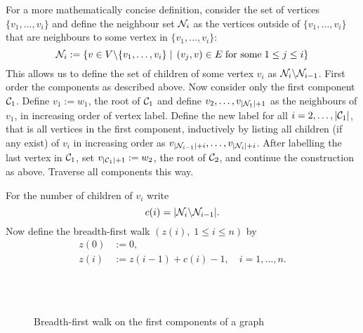 For a more mathematically concise definition,
consider the set of vertices $\{ v_1,\dots, v_i \}$
and define the neighbour set $\mathcal{N}_{i}$ as the vertices outside of
$\{ v_1,\dots, v_i \}$ 
that are neighbours to some vertex in 
$\{ v_1,\dots, v_i \}$:
\begin{equation} \label{D: Ni}
\mathcal{N}_{i} := 
\left\lbrace v \in V \backslash \{ v_1,\dots, v_i \} 
\; | \; 
\left(v_j, v\right) \in E \; \text{for some} \; 1 \leq j \leq i \right\rbrace
\end{equation}
This allows us to define the set of children of some vertex $v_i$ as
$\mathcal{N}_{i} \backslash \mathcal{N}_{i-1}$.
First order the components as described above. 
Now consider only the first component $\mathcal{C}_{1}$.
Define $v_1 := w_1$, the root of $\mathcal{C}_{1}$ and define
$v_2, \dots , v_{|\mathcal{N}_{1}|+1}$ 
as the neighbours of $v_1$,
in increasing order of vertex label. 
Define the new label for all 
$i = 2, \dots, |\mathcal{C}_{1}|$,
that is all vertices in the first component,
inductively by listing all children (if any exist) of $v_i$
in increasing order as 
$ v_{|\mathcal{N}_{i-1}|+i}, \dots, v_{|\mathcal{N}_{i}|+i} $.
After labelling the last vertex in $\mathcal{C}_{1}$, set
$v_{|\mathcal{C}_{1}| + 1} := w_2$, 
the root of $\mathcal{C}_{2}$, and continue the construction as above.
Traverse all components this way.


For the number of children of $v_i$ write 
\begin{equation} \label{D: ci}
c(i) = |\mathcal{N}_{i} \backslash\mathcal{N}_{i-1}|.
\end{equation}
Now define the breadth-first walk 
$(z(i), \; 1 \leq i \leq n)$
by
\begin{equation} \label{E: def bf-walk z}
\begin{aligned}
z(0) &:= 0, \\
z(i) &:= z(i-1) + c(i) -1, \quad i=1, \dots , n.
\end{aligned}
\end{equation}



\begin{figure} [H]
	\centering
	\\
	
	\centering
	\\
	
	\centering
	
	\caption{Breadth-first walk on the first components of a graph}
	\label{F: bf-walk discrete}
\end{figure} 

